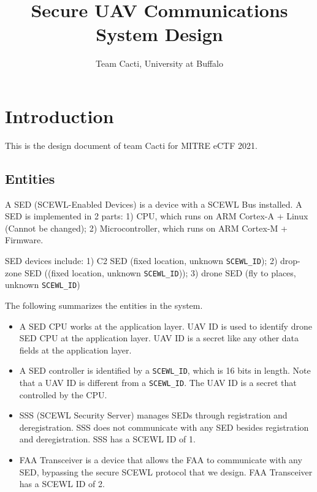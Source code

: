 \documentclass[11pt,oneside,onecolumn,letterpaper]{article}
\title{Secure UAV Communications System Design}
\author{Team Cacti, University at Buffalo}
\date{}
\begin{document}
\normalsize


\maketitle

\renewcommand{\thepage}{System Design, Team Cacti, University at Buffalo--\arabic{page}}
\setcounter{page}{1} \normalsize
%

\newcommand{\flagRollback}{\textsf{Rollback}\xspace}

\section{Introduction}

This is the design document of team Cacti for MITRE eCTF 2021.

\subsection{Entities}

A SED (SCEWL-Enabled Devices) is a device with a SCEWL Bus installed. 
A SED is implemented in 2 parts: 1) CPU, which runs on ARM Cortex-A + Linux (Cannot be changed); 2) 
Microcontroller, which runs on ARM Cortex-M + Firmware. 
	
SED devices include: 
1) C2 SED (fixed location, unknown \verb|SCEWL_ID|); 
2) drop-zone SED ((fixed location, unknown \verb|SCEWL_ID|)); 
3) drone SED (fly to places, unknown \verb|SCEWL_ID|)

The following summarizes the entities in the system.

\begin{itemize}
	\item A SED CPU works at the application layer. UAV ID is used to identify drone SED CPU at the application layer. UAV ID is a secret like any other data fields at the application layer.
	
	\item A SED controller is identified by a \verb|SCEWL_ID|, which is 16 bits in length. Note that a UAV ID is different from a \verb|SCEWL_ID|. The UAV ID is a secret that controlled by the CPU.
	
	\item SSS (SCEWL Security Server) manages SEDs through registration
and deregistration. SSS does not communicate with any SED besides registration
and deregistration. SSS has a SCEWL ID of 1.
	
	\item FAA Transceiver is a device that allows the FAA to communicate with any SED, bypassing the secure SCEWL protocol that we design. FAA Transceiver has a SCEWL ID of 2.
\end{itemize}
\end{document}
